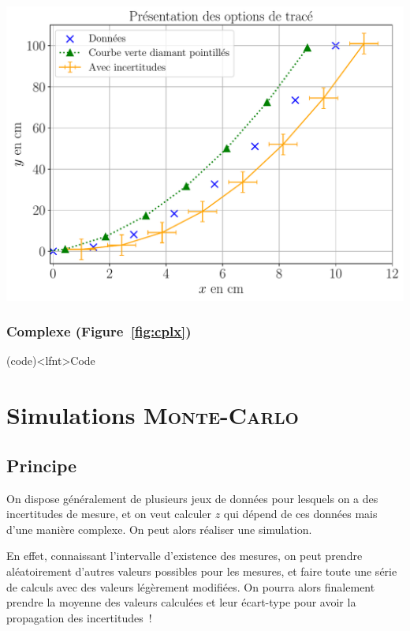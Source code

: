 \documentclass[a4paper, 12pt, garamond]{book}
\begin{document}
\begin{minipage}[t]{.48\linewidth}
	~
	\begin{center}
		\includegraphics[width=\linewidth]{figures/python_plt-2}
		\label{fig:cplx}
	\end{center}
\end{minipage}

\subsubsection{Complexe (Figure~\ref{fig:cplx})}
\begin{tcb}[breakable](code)<lfnt>{Code}
	\vspace{-10pt}
\end{tcb}

\section{Simulations \textsc{Monte-Carlo}}
\subsection{Principe}
On dispose généralement de plusieurs jeux de données pour
lesquels on a des incertitudes de mesure, et on veut calculer $z$ qui dépend de
ces données mais d'une manière complexe. On peut alors réaliser une simulation.

En effet, connaissant l'intervalle d'existence des mesures, on peut prendre
aléatoirement d'autres valeurs possibles pour les mesures, et faire toute une
série de calculs avec des valeurs légèrement modifiées. On pourra alors
finalement prendre la moyenne des valeurs calculées et leur écart-type pour
avoir la propagation des incertitudes~!
\end{document}
